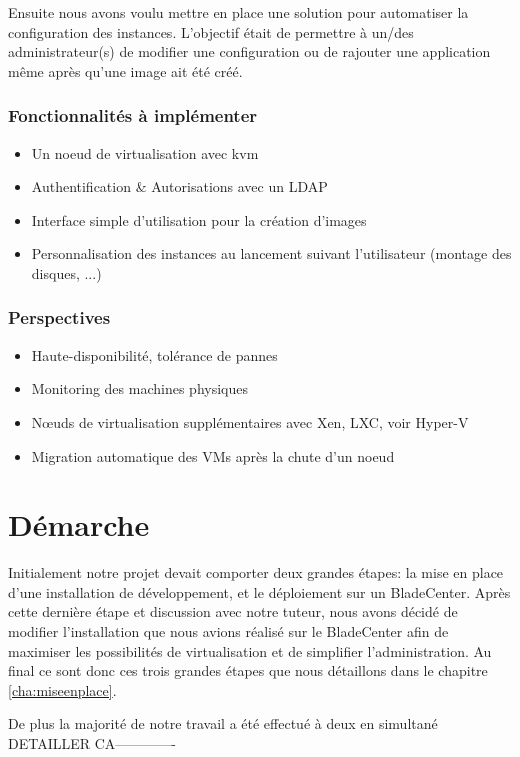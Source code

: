 \documentclass[a4paper,oneside]{report}
\begin{document}
Ensuite nous avons voulu mettre en place une solution pour automatiser la configuration des instances.
L'objectif était de permettre à un/des administrateur(s) de modifier une configuration ou de rajouter une application même après qu'une image ait été créé.

\subsubsection{Fonctionnalités à implémenter}
\begin{itemize}
\item Un noeud de \gls{virtualisation} avec \gls{kvm}
\item Authentification \& Autorisations avec un LDAP
\item Interface simple d'utilisation pour la création d'images
\item Personnalisation des instances au lancement suivant l'utilisateur (montage des disques, ...)
\end{itemize}

\subsubsection{Perspectives}
\begin{itemize}
\item Haute-disponibilité, tolérance de pannes
\item Monitoring des machines physiques
\item Nœuds de \gls{virtualisation} supplémentaires avec Xen, LXC, voir Hyper-V
\item Migration automatique des VMs après la chute d'un noeud
\end{itemize}

\section{Démarche}
Initialement notre projet devait comporter deux grandes étapes: la mise en place d'une installation de développement, et le déploiement sur un BladeCenter. Après cette dernière étape et discussion avec notre tuteur, nous avons décidé de modifier l'installation que nous avions réalisé sur le BladeCenter afin de maximiser les possibilités de virtualisation et de simplifier l'administration.\newline
Au final ce sont donc ces trois grandes étapes que nous détaillons dans le chapitre \ref{cha:miseenplace}.

De plus la majorité de notre travail a été effectué à deux en simultané DETAILLER CA-------------
\end{document}
